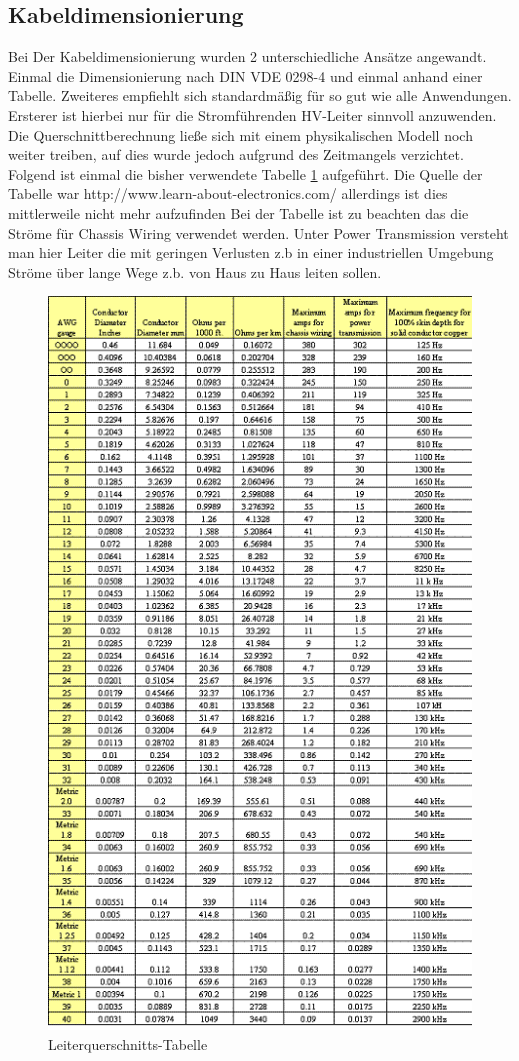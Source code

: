 \subsection{Kabeldimensionierung}
Bei Der Kabeldimensionierung wurden 2 unterschiedliche Ansätze angewandt. Einmal die Dimensionierung nach DIN VDE 0298-4 und einmal anhand einer Tabelle. Zweiteres empfiehlt sich standardmäßig für so gut wie alle Anwendungen. Ersterer ist hierbei nur für die Stromführenden \ac{HV}-Leiter sinnvoll anzuwenden. Die Querschnittberechnung ließe sich mit einem physikalischen Modell noch weiter treiben, auf dies wurde jedoch aufgrund des Zeitmangels verzichtet.
Folgend ist einmal die bisher verwendete Tabelle \ref{fig:wire-thickness} aufgeführt. Die Quelle der Tabelle war http://www.learn-about-electronics.com/ allerdings ist dies mittlerweile nicht mehr aufzufinden
Bei der Tabelle ist zu beachten das die Ströme für Chassis Wiring verwendet werden. Unter Power Transmission versteht man hier Leiter die mit geringen Verlusten z.b in einer industriellen Umgebung Ströme über lange Wege z.b. von Haus zu Haus leiten sollen.
\begin{figure}[h]
	\centering
	\includegraphics[width=0.7\linewidth]{"bilder/Wire thickness"}
	\caption{Leiterquerschnitts-Tabelle}
	\label{fig:wire-thickness}
\end{figure}

